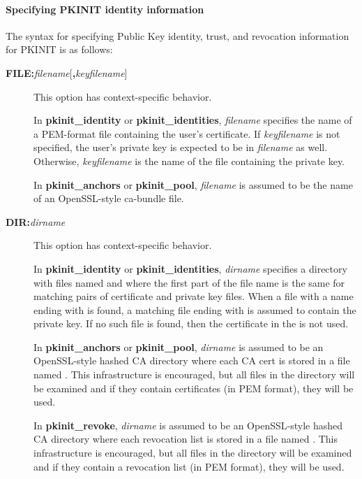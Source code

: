 \documentclass[letterpaper,10pt,english]{sphinxmanual}
\begin{document}
\paragraph{Specifying PKINIT identity information}
\label{admin/conf_files/krb5_conf:specifying-pkinit-identity-information}\label{admin/conf_files/krb5_conf:pkinit-identity}
The syntax for specifying Public Key identity, trust, and revocation
information for PKINIT is as follows:
\begin{description}
\item[{\textbf{FILE:}\emph{filename}{[}\textbf{,}\emph{keyfilename}{]}}] \leavevmode
This option has context-specific behavior.

In \textbf{pkinit\_identity} or \textbf{pkinit\_identities}, \emph{filename}
specifies the name of a PEM-format file containing the user's
certificate.  If \emph{keyfilename} is not specified, the user's
private key is expected to be in \emph{filename} as well.  Otherwise,
\emph{keyfilename} is the name of the file containing the private key.

In \textbf{pkinit\_anchors} or \textbf{pkinit\_pool}, \emph{filename} is assumed to
be the name of an OpenSSL-style ca-bundle file.

\item[{\textbf{DIR:}\emph{dirname}}] \leavevmode
This option has context-specific behavior.

In \textbf{pkinit\_identity} or \textbf{pkinit\_identities}, \emph{dirname}
specifies a directory with files named  and 
where the first part of the file name is the same for matching
pairs of certificate and private key files.  When a file with a
name ending with  is found, a matching file ending with
 is assumed to contain the private key.  If no such file
is found, then the certificate in the  is not used.

In \textbf{pkinit\_anchors} or \textbf{pkinit\_pool}, \emph{dirname} is assumed to
be an OpenSSL-style hashed CA directory where each CA cert is
stored in a file named .  This infrastructure
is encouraged, but all files in the directory will be examined and
if they contain certificates (in PEM format), they will be used.

In \textbf{pkinit\_revoke}, \emph{dirname} is assumed to be an OpenSSL-style
hashed CA directory where each revocation list is stored in a file
named .  This infrastructure is encouraged,
but all files in the directory will be examined and if they
contain a revocation list (in PEM format), they will be used.


\end{description}
\end{document}
